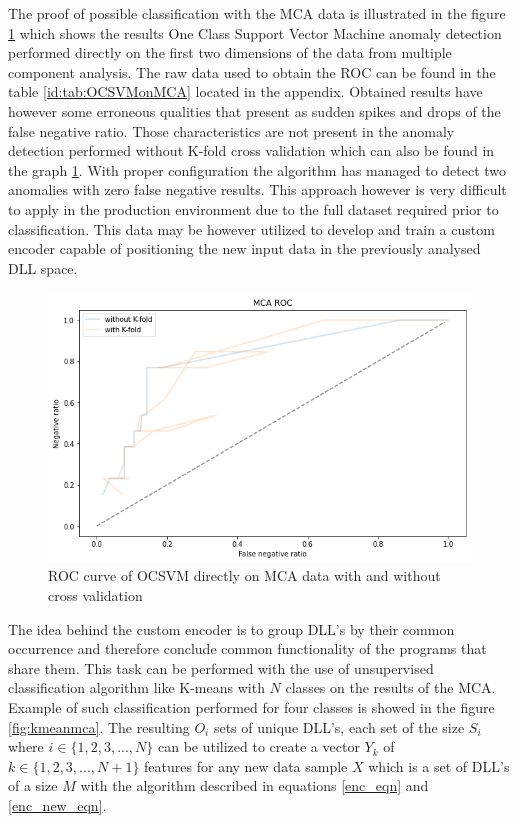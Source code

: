 \documentclass[a4paper,twoside,12pt]{book}
\begin{document}
The proof of possible classification with the MCA data is illustrated in the figure \ref{fig:mcaroc} which shows the 
results One Class Support Vector Machine anomaly detection performed directly on the first two dimensions 
of the data from multiple component analysis. The raw data used to obtain the ROC can be found in the table
\ref{id:tab:OCSVMonMCA} located in the appendix. Obtained results have however some erroneous qualities that
present as sudden spikes and drops of the false negative ratio. Those characteristics are not present in the 
anomaly detection performed without K-fold cross validation which can also be found in the graph \ref{fig:mcaroc}. 
With proper configuration the algorithm has managed to detect 
two anomalies with zero false negative results. This approach however is very difficult to apply in the 
production environment due to the full dataset required prior to classification. This data may be however 
utilized to develop and train a custom encoder capable of positioning the new input data in the previously 
analysed DLL space.  


 \begin{figure}
	\centering
	\includegraphics[scale=0.9]{images/MCAROCbothKFandNot.PNG}
	\caption{ROC curve of OCSVM directly on MCA data with and without cross validation}
	\label{fig:mcaroc}
 \end{figure}

The idea behind the custom encoder is to group DLL's by their common occurrence and therefore
conclude common functionality of the programs that share them. This task can be performed
with the use of unsupervised classification algorithm like K-means with $\mathit{N}$ classes 
on the results of the MCA. Example of such classification
performed for four classes is showed in the figure \ref{fig:kmeanmca}. The resulting 
$\mathit{O_{i}}$ sets of unique DLL's, each set of the size $\mathit{S_{i}}$  where 
$\mathit{i\in\{1, 2, 3,..., N\}}$  can be utilized to create a 
vector $\mathit{Y_{k}}$ of $\mathit{k\in\{1, 2, 3, ..., N + 1\}}$ features for any new 
data sample $\mathit{X}$ which is a set of DLL's of a size $\mathit{M}$ with the algorithm
described in equations \ref{enc_eqn} and \ref{enc_new_eqn}. 
\end{document}
